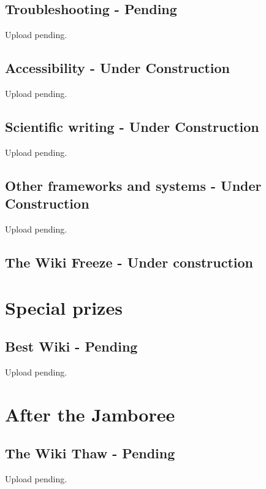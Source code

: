 \documentclass[a4paper, 11pt, twoside]{book}
\begin{document}
\chapter{Troubleshooting - Pending} \label{ch:troubleshooting}
Upload pending. %
%
\newpage
%

\chapter{Accessibility - Under Construction} \label{ch:accessibility}
Upload pending. %


\chapter{Scientific writing - Under Construction} \label{ch:scientificwriting}
Upload pending. %


\chapter{Other frameworks and systems - Under Construction} \label{ch:othersystems}
Upload pending. %


\chapter{The Wiki Freeze - Under construction}  \label{ch:freeze}

\newpage
%

\part{Special prizes}\label{part:special-prizes}


\chapter{Best Wiki - Pending} \label{ch:bestwiki}
%
Upload pending. %
\newpage

\part{After the Jamboree}\label{part:after-the-jamboree}


\chapter{The Wiki Thaw - Pending} \label{ch:thaw}
Upload pending. %
%
\newpage
%
%
\end{document}
